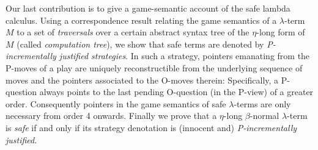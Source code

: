 Our last contribution is to give a game-semantic account of the safe
lambda calculus.
%
Using a correspondence result relating the game semantics of a
$\lambda$-term $M$ to a set of \emph{traversals} \cite{OngLics2006}
over a certain abstract syntax tree of the $\eta$-long form of $M$
(called \emph{computation tree}), we show that safe terms are denoted
by \emph{P-incrementally justified strategies}. In such a strategy,
pointers emanating from the P-moves of a play are uniquely
reconstructible from the underlying sequence of moves and the pointers
associated to the O-moves therein: Specifically, a P-question always
points to the last pending O-question (in the P-view) of a greater
order. Consequently pointers in the game semantics of safe
$\lambda$-terms are only necessary from order 4 onwards. Finally we
prove that a $\eta$-long $\beta$-normal $\lambda$-term is \emph{safe}
if and only if its strategy denotation is (innocent and)
\emph{P-incrementally justified}.



